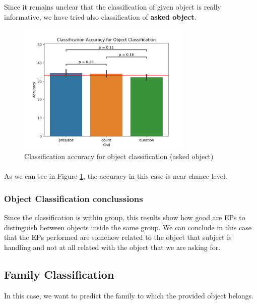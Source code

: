 \documentclass{article}
\begin{document}
Since it remains unclear that the classification of given object is really informative, we have tried also classification of \textbf{asked object}.

\begin{figure}[!h]
\begin{centering}
\includegraphics[width=0.75\textwidth]{./figures/giv_EP_obj_class_acc.png}
\caption{Classification accuracy for object classification (asked object)}
\label{ep_ask_obj_class_acc}
\end{centering}
\end{figure}

\paragraph{}
As we can see in Figure \ref{ep_ask_obj_class_acc}, the accuracy in this case is near chance level. 

\subsubsection*{Object Classification conclussions}
Since the classification is within group, this results show how good are EPs to distinguish between objects inside the same group. We can conclude in this case that the EPs performed are somehow related to the object that subject is handling and not at all related with the object that we are asking for. 

\subsection*{Family Classification}
In this case, we want to predict the family to which the provided object belongs. 
\end{document}
